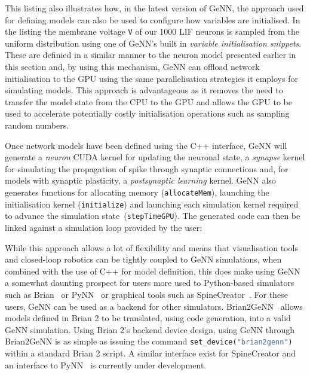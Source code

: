 \documentclass[utf8]{frontiersSCNS} %
\begin{document}
This listing also illustrates how, in the latest version of GeNN, the approach used for defining models can also be used to configure how variables are initialised.
In the listing the membrane voltage \lstinline{V} of our \num{1000} LIF neurons is sampled from the uniform distribution using one of GeNN's built in \textit{variable initialisation snippets}.
These are definied in a similar manner to the neuron model presented earlier in this section and, by using this mechanism, GeNN can offload network initialisation to the GPU using the same parallelisation strategies it employs for simulating models.
This approach is advantageous as it removes the need to transfer the model state from the CPU to the GPU and allows the GPU to be used to accelerate potentially costly initialisation operations such as sampling random numbers.

Once network models have been defined using the C++ interface, GeNN will generate a \textit{neuron} CUDA kernel for updating the neuronal state, a \textit{synapse} kernel for simulating the propagation of spike through synaptic connections and, for models with synaptic plasticity, a \textit{postsynaptic learning} kernel. 
GeNN also generates functions for allocating memory (\lstinline{allocateMem}), launching the initialisation kernel (\lstinline{initialize}) and launching each simulation kernel required to advance the simulation state~(\lstinline{stepTimeGPU}).
The generated code can then be linked against a simulation loop provided by the user:



While this approach allows a lot of flexibility and means that visualisation tools and closed-loop robotics can be tightly coupled to GeNN simulations, when combined with the use of C++ for model definition, this does make using GeNN a somewhat daunting prospect for users more used to Python-based simulators such as Brian~\citep{Stimberg2014} or PyNN~\citep{Davison2008a} or graphical tools such as SpineCreator~\citep{Cope2017}.
For these users, GeNN can be used as a backend for other simulators.
Brian2GeNN~\citep{Stimberg2018} allows models defined in Brian 2 to be translated, using code generation, into a valid GeNN simulation. 
Using Brian 2's backend device design, using GeNN through Brian2GeNN is as simple as issuing the command \lstinline[language=python]{set_device("brian2genn")} within a standard Brian 2 script. 
A similar interface exist for SpineCreator and an interface to PyNN~\citep{Davison2008a} is currently under development.
 
\end{document}
